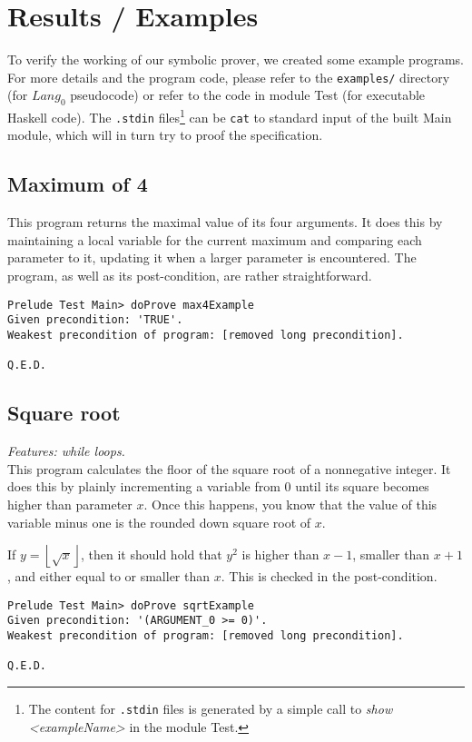 \documentclass[a4paper]{article}
\newcommand{\floor}[1]{\left\lfloor #1 \right\rfloor}
\begin{document}
\section{Results / Examples}
To verify the working of our symbolic prover, we created some example programs. For more details and the program code, please refer to the \texttt{examples/} directory (for $\mathit{Lang}_0$ pseudocode) or refer to the code in module \textsf{Test} (for executable Haskell code). The \texttt{.stdin} files\footnote{The content for \texttt{.stdin} files is generated by a simple call to \textit{show <exampleName>} in the module \textsf{Test}.} can be \texttt{cat} to standard input of the built Main module, which will in turn try to proof the specification.

\subsection{Maximum of 4}
This program returns the maximal value of its four arguments. It does this by maintaining a local variable for the current maximum and comparing each parameter to it, updating it when a larger parameter is encountered. The program, as well as its post-condition, are rather straightforward.

\begin{verbatim}
Prelude Test Main> doProve max4Example 
Given precondition: 'TRUE'.
Weakest precondition of program: [removed long precondition].

Q.E.D.
\end{verbatim}

\subsection{Square root}
\textit{Features: while loops.}\\
This program calculates the floor of the square root of a nonnegative integer. It does this by plainly incrementing a variable from 0 until its square becomes higher than parameter $x$. Once this happens, you know that the value of this variable minus one is the rounded down square root of $x$.

If $y = \floor{\sqrt{x}}$, then it should hold that $y^2$ is higher than $x - 1$, smaller than $x + 1$, and either equal to or smaller than $x$. This is checked in the post-condition.

\begin{verbatim}
Prelude Test Main> doProve sqrtExample 
Given precondition: '(ARGUMENT_0 >= 0)'.
Weakest precondition of program: [removed long precondition].

Q.E.D.
\end{verbatim}
\end{document}
